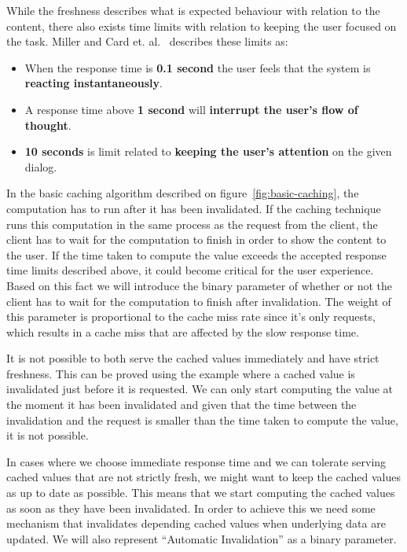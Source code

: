 
While the freshness describes what is expected behaviour with relation to the content, there also exists time limits with relation to keeping the user focused on the task. Miller and Card et. al.~\cite{paper:miller-response-time-limit, paper:card-response-time-limit} describes these limits as:

\begin{itemize}
  \item When the response time is \textbf{0.1 second} the user feels that the system is \textbf{reacting instantaneously}.
  \item A response time above \textbf{1 second} will \textbf{interrupt the user's flow of thought}.
  \item \textbf{10 seconds} is limit related to \textbf{keeping the user's attention} on the given dialog.
\end{itemize}

In the basic caching algorithm described on figure~\ref{fig:basic-caching}, the computation has to run after it has been invalidated. If the caching technique runs this computation in the same process as the request from the client, the client has to wait for the computation to finish in order to show the content to the user. If the time taken to compute the value exceeds the accepted response time limits described above, it could become critical for the user experience. Based on this fact we will introduce the binary parameter of whether or not the client has to wait for the computation to finish after invalidation. The weight of this parameter is proportional to the cache miss rate since it's only requests, which results in a cache miss that are affected by the slow response time.


It is not possible to both serve the cached values immediately and have strict freshness. This can be proved using the example where a cached value is invalidated just before it is requested. We can only start computing the value at the moment it has been invalidated and given that the time between the invalidation and the request is smaller than the time taken to compute the value, it is not possible.

In cases where we choose immediate response time and we can tolerate serving cached values that are not strictly fresh, we might want to keep the cached values as up to date as possible. This means that we start computing the cached values as soon as they have been invalidated. In order to achieve this we need some mechanism that invalidates depending cached values when underlying data are updated. We will also represent ``Automatic Invalidation'' as a binary parameter.

